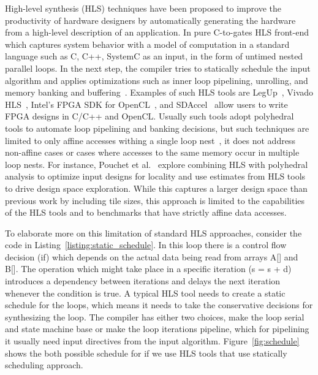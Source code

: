 High-level synthesis (HLS) techniques have been proposed to improve the productivity of hardware designers by automatically generating the hardware from a high-level description of an application.
In pure C-to-gates HLS front-end which captures system behavior with a model of computation in a standard language such as C, C++, SystemC as an input, in the form of untimed nested parallel loops.
In the next step, the compiler tries to statically schedule the input algorithm and applies optimizations such as inner loop pipelining, unrolling, and memory banking and buffering~\cite{chung_micro_2010, lee_1989_new, paulin_1989_force}.
Examples of such HLS tools are LegUp~\cite{canis_2011_legup}, Vivado HLS~\cite{vivadohls}, Intel’s FPGA SDK for OpenCL~\cite{opencl_sdk}, and SDAccel~\cite{sdaccel} allow users to write FPGA designs in C/C++ and OpenCL.
Usually such tools adopt polyhedral tools to automate loop pipelining and banking decisions, but such techniques are limited to only affine accesses withing a single loop nest~\cite{wang_2014_theory}, it does not address non-affine cases or cases where accesses to the same memory occur in multiple loop nests.
For instance, Pouchet et al.~\cite{pouchet_2013_polyhedral}  explore combining HLS with polyhedral analysis to optimize input designs for locality and use estimates from HLS tools to drive design space exploration.
While this captures a larger design space than previous work by including tile sizes, this approach is limited to the capabilities of the HLS tools and to benchmarks that have strictly affine data accesses.

To elaborate more on this limitation of standard HLS approaches, consider the code in Listing~\ref{listing:static_schedule}.
In this loop there is a control flow decision (if) which depends on the actual data being read from arrays A[] and B[].
The operation which might take place in a specific iteration (s = s + d) introduces a dependency between iterations and delays the next iteration whenever the condition is true.
A typical HLS tool needs to create a static schedule for the loops, which means it needs to take the conservative decisions for synthesizing the loop. The compiler has either two choices, make the loop serial and state machine base or make the loop iterations pipeline, which for pipelining it usually need input directives from the input algorithm.
Figure~\ref{fig:schedule} shows the both possible schedule for if we use HLS tools that use statically scheduling approach.


